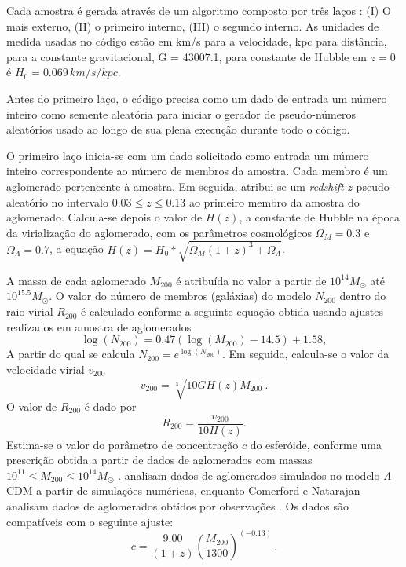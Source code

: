 Cada amostra é gerada através de um algoritmo composto por três laços : (I) O mais externo, (II) o primeiro interno, (III) o segundo interno. As unidades de medida usadas no código estão em km/s para a velocidade, kpc para distância, para a constante gravitacional, G = 43007.1, para constante de Hubble em $z=0$ é $H_0 = 0.069 \, km/s/kpc$.

Antes do primeiro laço, o código precisa como um dado de entrada um número inteiro como semente aleatória para iniciar o gerador de pseudo-números aleatórios usado ao longo de sua plena execução durante todo o código. 

O primeiro laço inicia-se com um dado solicitado como entrada um número inteiro correspondente ao número de membros da amostra. Cada membro é um aglomerado pertencente à amostra. Em seguida, atribui-se um \textit{redshift} $z$ pseudo-aleatório no intervalo $0.03 \leq z \leq 0.13$ ao primeiro membro da amostra do aglomerado. Calcula-se depois o valor de $H(z)$, a constante de Hubble na época da virialização do aglomerado, com os parâmetros cosmológicos $\Omega_M = 0.3$ e $\Omega_{\Lambda}=0.7$, a equação $H(z) = H_0*\sqrt{\Omega_M(1+z)^3 + \Omega_{\Lambda}}$.

A massa de cada aglomerado $M_{200}$ é atribuída no valor a partir de $10^{14} M_{\odot}$ até $10^{15.5}M_{\odot}$. O valor do número de membros (galáxias) do modelo $N_{200}$ dentro do raio virial $R_{200}$ é calculado conforme a seguinte equação obtida usando ajustes realizados em amostra de aglomerados \cite{andreon2012}
\begin{equation}
\log(N_{200}) = 0.47(\log(M_{200}) - 14.5) + 1.58,
\label{andreon}	
\end{equation}	
A partir do qual se calcula $N_{200} = e^{\log(N_{200})}$. Em seguida, calcula-se o valor da velocidade virial $v_{200}$\cite{springel1999}
\begin{equation}
v_{200} = \sqrt[3]{10GH(z)M_{200}} \, .
\label{velocidadevirial}
\end{equation}	
O valor de $R_{200}$ é dado por 
\begin{equation} R_{200} = \frac{v_{200}}{10H(z)}.
\label{rvirial}
\end{equation}
Estima-se o valor do parâmetro de concentração $c$ do esferóide, conforme uma prescrição obtida a partir de dados de aglomerados com massas $10^{11} \leq M_{200} \leq 10^{14} M_{\odot}$ \cite{Bullock}.  analisam dados de aglomerados simulados no modelo $\Lambda$CDM \cite{Bullock} a partir de simulações numéricas, enquanto Comerford e Natarajan analisam dados de aglomerados obtidos por observa\c c\~oes \cite{COMERFORD}. Os dados são compatíveis com o seguinte ajuste:
\begin{equation}
c = \frac{9.00}{(1+z)} \left(\frac{M_{200}}{1300}\right)^{(-0.13)} \, .	
\label{cparameter}
\end{equation}

